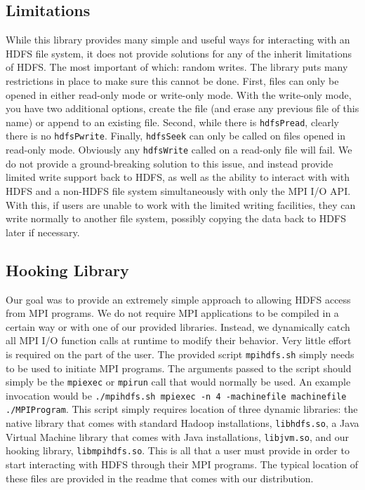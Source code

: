 \subsection{Limitations}
While this library provides many simple and useful ways for interacting with an HDFS file system, it does not provide solutions for any of the inherit limitations of HDFS. The most important of which: random writes. The library puts many restrictions in place to make sure this cannot be done. First, files can only be opened in either read-only mode or write-only mode. With the write-only mode, you have two additional options, create the file (and erase any previous file of this name) or append to an existing file. Second, while there is \texttt{hdfsPread}, clearly there is no \texttt{hdfsPwrite}. Finally, \texttt{hdfsSeek} can only be called on files opened in read-only mode. Obviously any \texttt{hdfsWrite} called on a read-only file will fail. We do not provide a ground-breaking solution to this issue, and instead provide limited write support back to HDFS, as well as the ability to interact with with HDFS and a non-HDFS file system simultaneously with only the MPI I/O API. With this, if users are unable to work with the limited writing facilities, they can write normally to another file system, possibly copying the data back to HDFS later if necessary.

\subsection{Hooking Library}
Our goal was to provide an extremely simple approach to allowing HDFS access from MPI programs. We do not require MPI applications to be compiled in a certain way or with one of our provided libraries. Instead, we dynamically catch all MPI I/O function calls at runtime to modify their behavior. Very little effort is required on the part of the user. The provided script \texttt{mpihdfs.sh} simply needs to be used to initiate MPI programs. The arguments passed to the script should simply be the \texttt{mpiexec} or \texttt{mpirun} call that would normally be used. An example invocation would be \texttt{./mpihdfs.sh mpiexec -n 4 -machinefile machinefile ./MPIProgram}. This script simply requires location of three dynamic libraries: the native library that comes with standard Hadoop installations, \texttt{libhdfs.so}, a Java Virtual Machine library that comes with Java installations, \texttt{libjvm.so}, and our hooking library, \texttt{libmpihdfs.so}. This is all that a user must provide in order to start interacting with HDFS through their MPI programs. The typical location of these files are provided in the readme that comes with our distribution.

